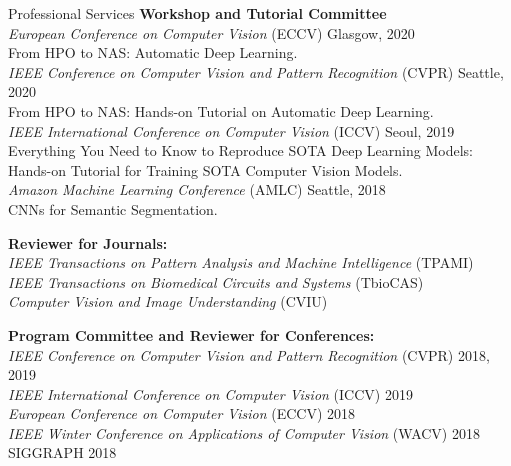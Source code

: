 \documentclass{resume} %
\begin{document}



\begin{rSection}{Professional Services}
{\bf Workshop and Tutorial Committee} \\
{\it European Conference on Computer Vision} (ECCV) \hfill{Glasgow, 2020}\\
From HPO to NAS: Automatic Deep Learning. \\

{\it IEEE Conference on Computer Vision and Pattern Recognition} (CVPR) \hfill{Seattle, 2020}\\
From HPO to NAS: Hands-on Tutorial on Automatic Deep Learning. \\

{\it IEEE International Conference on Computer Vision} (ICCV) \hfill{Seoul, 2019}\\
Everything You Need to Know to Reproduce SOTA Deep Learning Models: \\
Hands-on Tutorial for Training SOTA Computer Vision Models. \\

{\it Amazon Machine Learning Conference} (AMLC) \hfill{Seattle, 2018}\\
CNNs for Semantic Segmentation. 

{\bf Reviewer for Journals:} \\
{\it IEEE Transactions on Pattern Analysis and Machine Intelligence} (TPAMI) \\
{\it IEEE Transactions on Biomedical Circuits and Systems} (TbioCAS) \\
{\it Computer Vision and Image Understanding} (CVIU)

{\bf Program Committee and Reviewer for Conferences:} \\
{\it IEEE Conference on Computer Vision and Pattern Recognition} (CVPR) \hfill{2018, 2019}\\
{\it IEEE International Conference on Computer Vision} (ICCV)  \hfill{2019}\\
{\it European Conference on Computer Vision} (ECCV) \hfill{2018}\\
{\it IEEE Winter Conference on Applications of Computer Vision} (WACV)  \hfill{2018}\\
SIGGRAPH  \hfill{2018}


\end{rSection}
\end{document}
